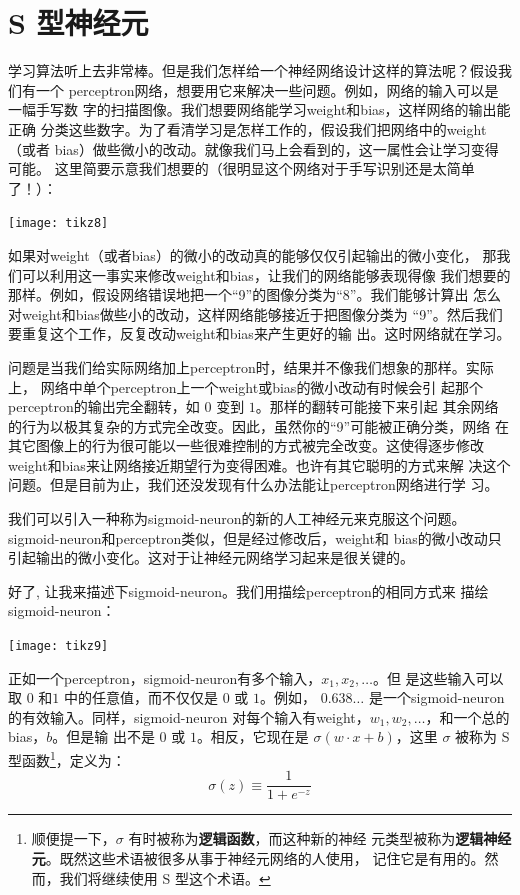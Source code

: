 \section{S 型神经元}
\label{seq:sigmoid_neurons}

学习算法听上去非常棒。但是我们怎样给一个神经网络设计这样的算法呢？假设我们有一个%
\gls*{perceptron}网络，想要用它来解决一些问题。例如，网络的输入可以是一幅手写数
字的扫描图像。我们想要网络能学习\gls*{weight}和\gls*{bias}，这样网络的输出能正确
分类这些数字。为了看清学习是怎样工作的，假设我们把网络中的\gls*{weight}（或者%
  \gls*{bias}）做些微小的改动。就像我们马上会看到的，这一属性会让学习变得可能。
这里简要示意我们想要的（很明显这个网络对于手写识别还是太简单了！）：
\begin{center}
  \texttt{[image: tikz8]}  
\end{center}

如果对\gls*{weight}（或者\gls*{bias}）的微小的改动真的能够仅仅引起输出的微小变化，
那我们可以利用这一事实来修改\gls*{weight}和\gls*{bias}，让我们的网络能够表现得像
我们想要的那样。例如，假设网络错误地把一个“9”的图像分类为“8”。我们能够计算出
怎么对\gls*{weight}和\gls*{bias}做些小的改动，这样网络能够接近于把图像分类为
“9”。然后我们要重复这个工作，反复改动\gls*{weight}和\gls*{bias}来产生更好的输
出。这时网络就在学习。

问题是当我们给实际网络加上\gls*{perceptron}时，结果并不像我们想象的那样。实际上，
网络中单个\gls*{perceptron}上一个\gls*{weight}或\gls*{bias}的微小改动有时候会引
起那个\gls*{perceptron}的输出完全翻转，如 $0$ 变到 $1$。那样的翻转可能接下来引起
其余网络的行为以极其复杂的方式完全改变。因此，虽然你的“9”可能被正确分类，网络
在其它图像上的行为很可能以一些很难控制的方式被完全改变。这使得逐步修改%
\gls*{weight}和\gls*{bias}来让网络接近期望行为变得困难。也许有其它聪明的方式来解
决这个问题。但是目前为止，我们还没发现有什么办法能让\gls*{perceptron}网络进行学
习。

我们可以引入一种称为\gls*{sigmoid-neuron}的新的人工神经元来克服这个问题。%
\gls*{sigmoid-neuron}和\gls*{perceptron}类似，但是经过修改后，\gls*{weight}和%
\gls*{bias}的微小改动只引起输出的微小变化。这对于让神经元网络学习起来是很关键的。

好了, 让我来描述下\gls*{sigmoid-neuron}。我们用描绘\gls*{perceptron}的相同方式来
描绘\gls*{sigmoid-neuron}：
\begin{center}
  \texttt{[image: tikz9]}
\end{center}

正如一个\gls*{perceptron}，\gls*{sigmoid-neuron}有多个输入，$x_1,x_2,\ldots$。但
是这些输入可以取 $0$ 和$1$ 中的任意值，而不仅仅是 $0$ 或 $1$。例如，
$0.638\ldots$ 是一个\gls*{sigmoid-neuron}的有效输入。同样，\gls*{sigmoid-neuron}
对每个输入有\gls*{weight}，$w_1,w_2,\ldots$，和一个总的\gls*{bias}，$b$。但是输
出不是 $0$ 或 $1$。相反，它现在是 $\sigma(w \cdot x+b)$，这里 $\sigma$ 被称为 S
型函数\footnote{顺便提一下，$\sigma$ 有时被称为\textbf{逻辑函数}，而这种新的神经
  元类型被称为\textbf{逻辑神经元}。既然这些术语被很多从事于神经元网络的人使用，
  记住它是有用的。然而，我们将继续使用 S 型这个术语。}，定义为：
\begin{equation}
  \sigma(z) \equiv \frac{1}{1+e^{-z}}
  \label{eq:3}\tag{3}
\end{equation}

